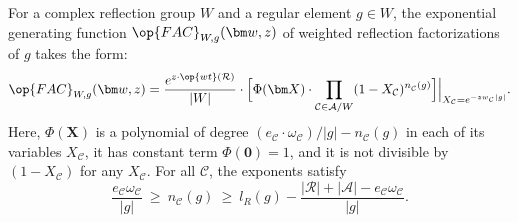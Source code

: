\begin{theo}\label{Thm: Main, weighted}
For a complex reflection group $W$ and a regular element $g\in W$, the exponential generating function $\op{FAC}_{W,g}(\bm w,z)$ of weighted reflection factorizations of $g$ takes the form:$$
\op{FAC}_{W,g}(\bm w,z)=\dfrac{e^{z\cdot\op{wt}(\mathcal{R})}}{|W|}\cdot \Big[ \Phi({\bm X})\cdot\prod_{\mathcal{C}\in\mathcal{A}/W} (1-X_\mathcal{C})^{n^{\phantom{l}}_{\mathcal{C}}(g)}\Big]\Big|_{X_{\mathcal{C}}=e^{-zw_{\mathcal{C}}|g|}}.$$ Here, $\Phi({\bm X})$ is a polynomial of degree $(e_{\mathcal{C}}\cdot \omega_{\mathcal{C}})/|g|-n_{\mathcal{C}}(g)$ in each of its variables $X_{\mathcal{C}}$, it has constant term $\Phi(\bm 0)=1$, and it is not divisible by $(1-X_{\mathcal{C}})$ for any $X_{\mathcal{C}}$. For all $\mathcal{C}$, the exponents satisfy $$\dfrac{e_{\mathcal{C}}\omega_{\mathcal{C}}}{|g|}\ \geq\  n_{\mathcal{C}}(g)\ \geq\  l_R(g)-\dfrac{|\mathcal{R}|+|\mathcal{A}|-e_{\mathcal{C}}\omega_{\mathcal{C}}}{|g|}.$$
\end{theo}
